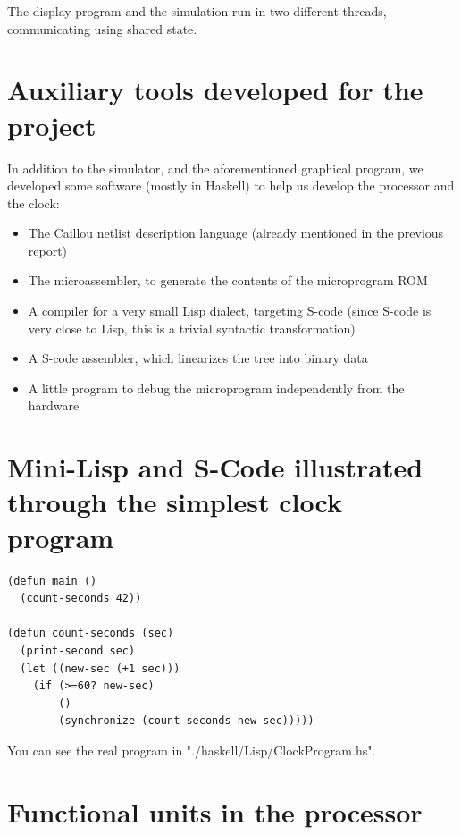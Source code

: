 \documentclass[a4paper, 11pt]{article}
\begin{document}
The display program and the simulation run in two different threads, communicating using shared state.


\section{Auxiliary tools developed for the project}

In addition to the simulator, and the aforementioned graphical program, we developed some software (mostly in Haskell) to help us develop the processor and the clock:
\begin{itemize}
\item The Caillou netlist description language (already mentioned in the previous report)
\item The microassembler, to generate the contents of the microprogram ROM
\item A compiler for a very small Lisp dialect, targeting S-code (since S-code is very close to Lisp, this is a trivial syntactic transformation)
\item A S-code assembler, which linearizes the tree into binary data
\item A little program to debug the microprogram independently from the hardware
\end{itemize}


\newpage
\appendix


\section{Mini-Lisp and S-Code illustrated through the simplest clock program}

\begin{lstlisting}
(defun main ()
  (count-seconds 42))

(defun count-seconds (sec)
  (print-second sec)
  (let ((new-sec (+1 sec)))
    (if (>=60? new-sec)
        ()  
        (synchronize (count-seconds new-sec)))))
\end{lstlisting}

You can see the real program in "./haskell/Lisp/ClockProgram.hs".

\newpage
\section{Functional units in the processor}
\end{document}
